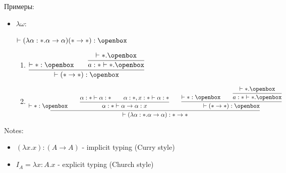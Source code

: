 \documentclass[12pt]{article}
\begin{document}
\vspace{5mm}   

Примеры:

\begin{itemize}
    \item $\lambda \omega$:
\begin{center}
    $\vdash (\lambda \alpha : * . \alpha \rightarrow \alpha) (* \rightarrow *) : \openbox$

\vspace{5mm}

\begin{enumerate}[]
    \item \begin{center}
        $\vcenter{\infer{\vdash (* \rightarrow *) : \openbox}{\vdash * : \openbox \qquad \infer{a:* \vdash *.\openbox}{\vdash *.\openbox} }}$
    \end{center}
    \item \begin{center} $\vcenter{\infer{\vdash (\lambda \alpha : * . \alpha \rightarrow \alpha) : * \rightarrow *}{\vdash * : \openbox \qquad \infer{\alpha : * \vdash \alpha \rightarrow \alpha : x}{\alpha : * \vdash \alpha : * \qquad \alpha : *, x : * \vdash \alpha : *} \qquad \infer{\vdash (* \rightarrow *) : \openbox}{\vdash * : \openbox \qquad \infer{a:* \vdash *.\openbox}{\vdash *.\openbox} } }}$
    \end{center}
\end{enumerate}
\end{center}


\end{itemize}

Notes:
\begin{itemize}
    \item $(\lambda x.x) : (A \rightarrow A)$ - implicit typing (Curry style)
    \item $I_A = \lambda x : A.x$ - explicit typing (Church style)
\end{itemize}
\end{document}
